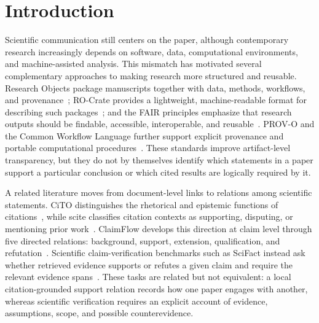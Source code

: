 \section{Introduction}\label{sec:introduction}

Scientific communication still centers on the paper, although contemporary research increasingly depends on software, data, computational environments, and machine-assisted analysis. This mismatch has motivated several complementary approaches to making research more structured and reusable. Research Objects package manuscripts together with data, methods, workflows, and provenance~\cite{bechhofer2013linked,belhajjame2015ontologies}; RO-Crate provides a lightweight, machine-readable format for describing such packages~\cite{soilandreyes2022rocrate,rocrate2024spec}; and the FAIR principles emphasize that research outputs should be findable, accessible, interoperable, and reusable~\cite{wilkinson2016fair}. PROV-O and the Common Workflow Language further support explicit provenance and portable computational procedures~\cite{w3c2013provo,crusoe2022cwl}. These standards improve artifact-level transparency, but they do not by themselves identify which statements in a paper support a particular conclusion or which cited results are logically required by it.

A related literature moves from document-level links to relations among scientific statements. CiTO distinguishes the rhetorical and epistemic functions of citations~\cite{shotton2010cito}, while scite classifies citation contexts as supporting, disputing, or mentioning prior work~\cite{nicholson2021scite}. ClaimFlow develops this direction at claim level through five directed relations: background, support, extension, qualification, and refutation~\cite{pramanick2026claimflow}. Scientific claim-verification benchmarks such as SciFact instead ask whether retrieved evidence supports or refutes a given claim and require the relevant evidence spans~\cite{wadden2020scifact}. These tasks are related but not equivalent: a local citation-grounded support relation records how one paper engages with another, whereas scientific verification requires an explicit account of evidence, assumptions, scope, and possible counterevidence.

